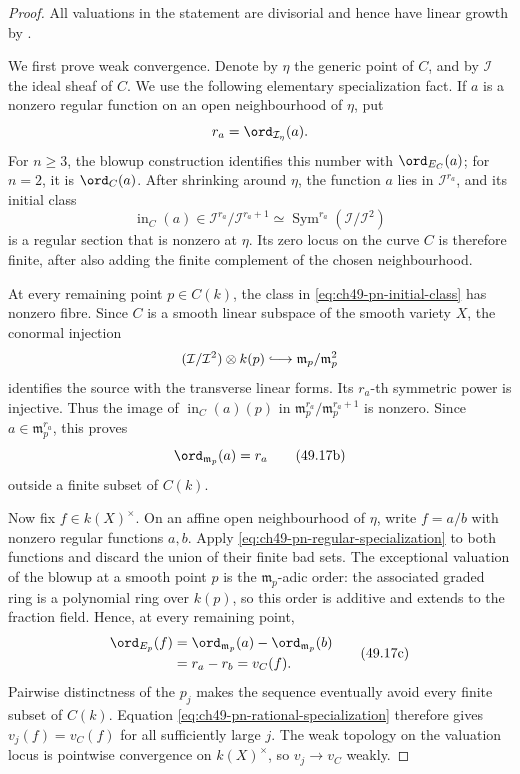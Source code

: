 \begin{proof}
All valuations in the statement are divisorial and hence have linear growth
by \cite[Proposition~1.28]{BJ22}.

We first prove weak convergence.  Denote by \(\eta\) the generic point of
\(C\), and by \(\mathcal I\) the ideal sheaf of \(C\).  We use the following
elementary specialization fact.  If \(a\) is a nonzero regular function on
an open neighbourhood of \(\eta\), put
\[
 r_a=\ord_{\mathcal I_\eta}(a).
\]
For \(n\ge3\), the blowup construction identifies this number with
\(\ord_{E_C}(a)\); for \(n=2\), it is \(\ord_C(a)\).  After shrinking
around \(\eta\), the function \(a\) lies in \(\mathcal I^{r_a}\), and its
initial class
\[
 \operatorname{in}_C(a)
 \in \mathcal I^{r_a}/\mathcal I^{r_a+1}
 \simeq \operatorname{Sym}^{r_a}(\mathcal I/\mathcal I^2)
\tag{49.17a}\label{eq:ch49-pn-initial-class}
\]
is a regular section that is nonzero at \(\eta\).  Its zero locus on the
curve \(C\) is therefore finite, after also adding the finite complement of
the chosen neighbourhood.

At every remaining point \(p\in C(k)\), the class in
\eqref{eq:ch49-pn-initial-class} has nonzero fibre.  Since \(C\) is a smooth
linear subspace of the smooth variety \(X\), the conormal injection
\[
 (\mathcal I/\mathcal I^2)\otimes k(p)
 \lhook\joinrel\longrightarrow
 \mathfrak m_p/\mathfrak m_p^2
\]
identifies the source with the transverse linear forms.  Its \(r_a\)-th
symmetric power is injective.  Thus the image of
\(\operatorname{in}_C(a)(p)\) in
\(\mathfrak m_p^{r_a}/\mathfrak m_p^{r_a+1}\) is nonzero.  Since
\(a\in\mathfrak m_p^{r_a}\), this proves
\[
             \ord_{\mathfrak m_p}(a)=r_a
\tag{49.17b}\label{eq:ch49-pn-regular-specialization}
\]
outside a finite subset of \(C(k)\).

Now fix \(f\in k(X)^\times\).  On an affine open neighbourhood of \(\eta\),
write \(f=a/b\) with nonzero regular functions \(a,b\).  Apply
\eqref{eq:ch49-pn-regular-specialization} to both functions and discard the
union of their finite bad sets.  The exceptional valuation of the blowup at
a smooth point \(p\) is the \(\mathfrak m_p\)-adic order: the associated
graded ring is a polynomial ring over \(k(p)\), so this order is additive
and extends to the fraction field.  Hence, at every remaining point,
\[
 \begin{aligned}
  \ord_{E_p}(f)
    &=\ord_{\mathfrak m_p}(a)-\ord_{\mathfrak m_p}(b)\\
    &=r_a-r_b=v_C(f).
 \end{aligned}
\tag{49.17c}\label{eq:ch49-pn-rational-specialization}
\]
Pairwise distinctness of the \(p_j\) makes the sequence eventually avoid
every finite subset of \(C(k)\).  Equation
\eqref{eq:ch49-pn-rational-specialization} therefore gives
\(v_j(f)=v_C(f)\) for all sufficiently large \(j\).  The weak topology on
the valuation locus is pointwise convergence on \(k(X)^\times\), so
\(v_j\to v_C\) weakly.


\end{proof}
